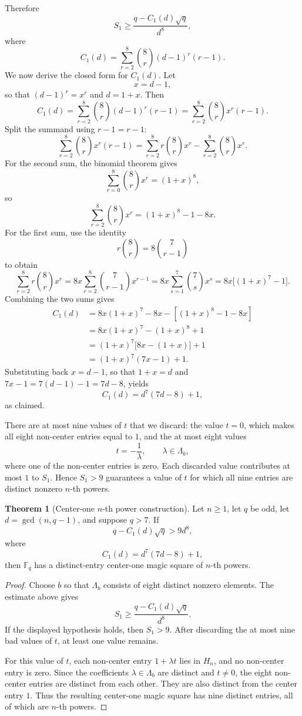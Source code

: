 \documentclass{article}
\newcommand{\F}{\mathbb F}
\theoremstyle{definition}
\newtheorem{theorem}{Theorem}
\numberwithin{equation}{section}
\begin{document}
Therefore
\[
S_1\geq
\frac{q-C_1(d)\sqrt q}{d^8},
\]
where
\[
C_1(d)=\sum_{r=2}^8 {8\choose r}(d-1)^r(r-1).
\]
We now derive the closed form for \(C_1(d)\). Let
\[
x=d-1,
\]
so that \((d-1)^r=x^r\) and \(d=1+x\). Then
\[
C_1(d)
=
\sum_{r=2}^{8}\binom{8}{r}(d-1)^r(r-1)
=
\sum_{r=2}^{8}\binom{8}{r}x^r(r-1).
\]
Split the summand using \(r-1=r-1\):
\[
\sum_{r=2}^{8}\binom{8}{r}x^r(r-1)
=
\sum_{r=2}^{8}r\binom{8}{r}x^r
-
\sum_{r=2}^{8}\binom{8}{r}x^r.
\]
For the second sum, the binomial theorem gives
\[
\sum_{r=0}^{8}\binom{8}{r}x^r=(1+x)^8,
\]
so
\[
\sum_{r=2}^{8}\binom{8}{r}x^r
=
(1+x)^8-1-8x.
\]
For the first sum, use the identity
\[
r\binom{8}{r}=8\binom{7}{r-1}
\]
to obtain
\[
\sum_{r=2}^{8}r\binom{8}{r}x^r
=
8x\sum_{r=2}^{8}\binom{7}{r-1}x^{r-1}
=
8x\sum_{s=1}^{7}\binom{7}{s}x^s
=
8x\bigl[(1+x)^7-1\bigr].
\]
Combining the two sums gives
\begin{align*}
C_1(d)
&=8x(1+x)^7-8x-\left[(1+x)^8-1-8x\right] \\
&=8x(1+x)^7-(1+x)^8+1 \\
&=(1+x)^7\bigl[8x-(1+x)\bigr]+1 \\
&=(1+x)^7(7x-1)+1.
\end{align*}
Substituting back \(x=d-1\), so that \(1+x=d\) and
\(7x-1=7(d-1)-1=7d-8\), yields
\[
C_1(d)=d^7(7d-8)+1,
\]
as claimed.

There are at most nine values of \(t\) that we discard: the value \(t=0\), which
makes all eight non-center entries equal to \(1\), and the at most eight values
\[
t=-\frac{1}{\lambda},
\qquad \lambda\in\Lambda_b,
\]
where one of the non-center entries is zero.  Each discarded value contributes at
most \(1\) to \(S_1\).  Hence \(S_1>9\) guarantees a value of \(t\) for which all
nine entries are distinct nonzero \(n\)-th powers.

\begin{theorem}[Center-one \(n\)-th power construction]
\label{center-one-nth-power}
Let \(n\geq1\), let \(q\) be odd, let \(d=\gcd(n,q-1)\), and suppose \(q>7\). If
\[
q-C_1(d)\sqrt q>9d^8,
\]
where
\[
C_1(d)=d^7(7d-8)+1,
\]
then \(\F_q\) has a distinct-entry center-one magic square of \(n\)-th powers.
\end{theorem}

\begin{proof}
Choose \(b\) so that \(\Lambda_b\) consists of eight distinct nonzero elements.
The estimate above gives
\[
S_1\geq \frac{q-C_1(d)\sqrt q}{d^8}.
\]
If the displayed hypothesis holds, then \(S_1>9\).  After discarding the at most
nine bad values of \(t\), at least one value remains.

For this value of \(t\), each non-center entry \(1+\lambda t\) lies in \(H_n\),
and no non-center entry is zero.  Since the coefficients \(\lambda\in\Lambda_b\)
are distinct and \(t\neq0\), the eight non-center entries are distinct from each
other.  They are also distinct from the center entry \(1\).  Thus the resulting
center-one magic square has nine distinct entries, all of which are \(n\)-th
powers.
\end{proof}
\end{document}
